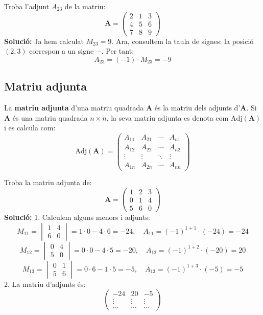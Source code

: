 \documentclass[12pt]{article}
\newcommand{\mat}[1]{\mathbf{#1}}
\begin{document}
\begin{exemple}
Troba l'adjunt $A_{23}$ de la matriu:
\[
\mat{A} = \begin{pmatrix}
2 & 1 & 3 \\
4 & 5 & 6 \\
7 & 8 & 9
\end{pmatrix}
\]
\textbf{Solució:}
Ja hem calculat $M_{23} = 9$. Ara, consultem la taula de signes: la posició $(2,3)$ correspon a un signe $-$. Per tant:
\[
A_{23} = (-1) \cdot M_{23} = -9
\]
\end{exemple}

\subsection{Matriu adjunta}
\begin{concept}
La \textbf{matriu adjunta} d'una matriu quadrada $\mat{A}$ és la matriu dels adjunts d'$\mat{A}$. Si $\mat{A}$ és una matriu quadrada $n \times n$, la seva matriu adjunta es denota com $\text{Adj}(\mat{A})$ i es calcula com:
\[
\text{Adj}(\mat{A}) = \begin{pmatrix}
A_{11} & A_{21} & \cdots & A_{n1} \\
A_{12} & A_{22} & \cdots & A_{n2} \\
\vdots & \vdots & \ddots & \vdots \\
A_{1n} & A_{2n} & \cdots & A_{nn}
\end{pmatrix}
\]
\end{concept}

\begin{exemple}
Troba la matriu adjunta de:
\[
\mat{A} = \begin{pmatrix}
1 & 2 & 3 \\
0 & 1 & 4 \\
5 & 6 & 0
\end{pmatrix}
\]
\textbf{Solució:}
1. Calculem alguns menors i adjunts:
\[
M_{11} = \begin{vmatrix}
1 & 4 \\
6 & 0
\end{vmatrix} = 1\cdot0 - 4\cdot6 = -24, \quad A_{11} = (-1)^{1+1} \cdot (-24) = -24
\]
\[
M_{12} = \begin{vmatrix}
0 & 4 \\
5 & 0
\end{vmatrix} = 0\cdot0 - 4\cdot5 = -20, \quad A_{12} = (-1)^{1+2} \cdot (-20) = 20
\]
\[
M_{13} = \begin{vmatrix}
0 & 1 \\
5 & 6
\end{vmatrix} = 0\cdot6 - 1\cdot5 = -5, \quad A_{13} = (-1)^{1+3} \cdot (-5) = -5
\]
2. La matriu d'adjunts és:
\[
\begin{pmatrix}
-24 & 20 & -5 \\
\vdots & \vdots & \vdots \\
\cdots & \cdots & \cdots
\end{pmatrix}
\]

\end{exemple}
\end{document}
